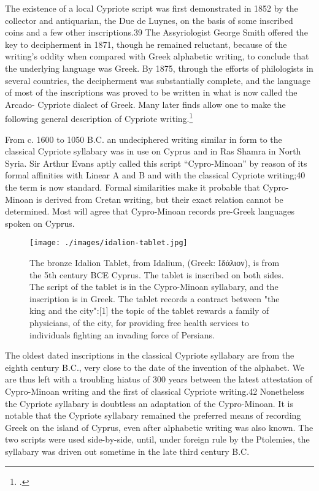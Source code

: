 The existence of a local Cypriote script was first demonstrated in
1852 by the collector and antiquarian, the Due de Luynes, on the basis of
some inscribed coins and a few other inscriptions.39 The Assyriologist
George Smith offered the key to decipherment in 1871, though he
remained reluctant, because of the writing's oddity when compared with
Greek alphabetic writing, to conclude that the underlying language was
Greek. By 1875, through the efforts of philologists in several countries, the
decipherment was substantially complete, and the language of most of the
inscriptions was proved to be written in what is now called the Arcado-
Cypriote dialect of Greek. Many later finds allow one to make the
following general description of Cypriote writing.\footcite{powell1991}

From c. 1600 to 1050 B.C. an undeciphered writing similar in form to the
classical Cypriote syllabary was in use on Cyprus and in Ras Shamra in
North Syria. Sir Arthur Evans aptly called this script ``Cypro-Minoan'' by
reason of its formal affinities with Linear A and Β and with the classical
Cypriote writing;40 the term is now standard. Formal similarities make it
probable that Cypro-Minoan is derived from Cretan writing, but their
exact relation cannot be determined. Most will agree that Cypro-Minoan
records pre-Greek languages spoken on Cyprus.

\begin{figure}[htb]
\parindent0pt
\centering

\texttt{[image: ./images/idalion-tablet.jpg]}

\caption[Idalion tablet.]{The bronze Idalion Tablet, from Idalium, (Greek: Ιδάλιον), is from the 5th century BCE Cyprus. The tablet is inscribed on both sides. The script of the tablet is in the Cypro-Minoan syllabary, and the inscription is in Greek. The tablet records a contract between "the king and the city":[1] the topic of the tablet rewards a family of physicians, of the city, for providing free health services to individuals fighting an invading force of Persians.}
\label{fig:idalion}
\end{figure}


The oldest dated inscriptions in the classical Cypriote syllabary are from
the eighth century B.C., very close to the date of the invention of the
alphabet. We are thus left with a troubling hiatus of 300 years between the
latest attestation of Cypro-Minoan writing and the first of classical
Cypriote writing.42 Nonetheless the Cypriote syllabary is doubtless an
adaptation of the Cypro-Minoan. It is notable that the Cypriote syllabary
remained the preferred means of recording Greek on the island of Cyprus,
even after alphabetic writing was also known. The two scripts were used
side-by-side, until, under foreign rule by the Ptolemies, the syllabary was
driven out sometime in the late third century B.C.

